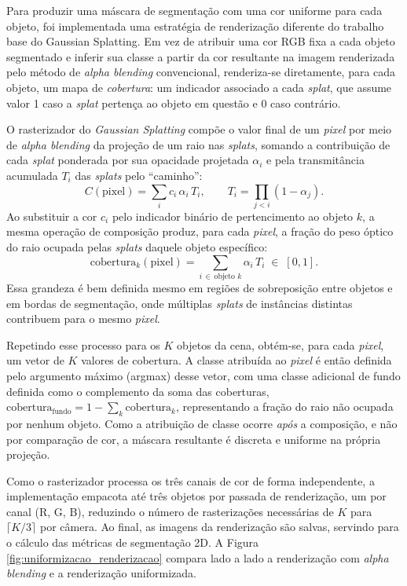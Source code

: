 Para produzir uma máscara de segmentação com uma cor uniforme para cada objeto, foi
implementada uma estratégia de renderização diferente do trabalho base do Gaussian Splatting. Em vez de atribuir uma cor RGB fixa a cada objeto segmentado e inferir sua classe a partir da cor resultante na imagem renderizada pelo método de \textit{alpha blending} convencional, renderiza-se diretamente, para cada objeto, um mapa de \textit{cobertura}: um indicador associado a cada
\emph{splat}, que assume valor 1 caso a
\emph{splat} pertença ao objeto em questão e 0 caso contrário.

O rasterizador do \textit{Gaussian Splatting} compõe o valor final de um
\textit{pixel} por meio de \textit{alpha blending} da projeção de um raio nas \emph{splats},
somando a contribuição de cada \emph{splat} ponderada por sua opacidade
projetada $\alpha_i$ e pela transmitância acumulada $T_i$ das \emph{splats} pelo ``caminho'':
\begin{equation}
    C(\text{pixel}) = \sum_{i} c_i \, \alpha_i \, T_i, \qquad
    T_i = \prod_{j<i} (1 - \alpha_j).
\end{equation}
Ao substituir a cor $c_i$ pelo indicador binário de pertencimento ao objeto
$k$, a mesma operação de composição produz, para cada \textit{pixel}, a
fração do peso óptico do raio ocupada pelas \emph{splats} daquele objeto
específico:
\begin{equation}
    \text{cobertura}_k(\text{pixel}) = \sum_{i \,\in\, \text{objeto } k} \alpha_i \, T_i \;\in\; [0,1].
\end{equation}
Essa grandeza é bem definida mesmo em regiões de sobreposição entre objetos e
em bordas de segmentação, onde múltiplas \emph{splats} de instâncias distintas
contribuem para o mesmo \textit{pixel}.

Repetindo esse processo para os $K$ objetos da cena, obtém-se, para cada
\textit{pixel}, um vetor de $K$ valores de cobertura. A classe atribuída ao
\textit{pixel} é então definida pelo argumento máximo (argmax) desse vetor, com uma
classe adicional de fundo definida como o complemento da soma das coberturas,
$\text{cobertura}_{\text{fundo}} = 1 - \sum_k \text{cobertura}_k$,
representando a fração do raio não ocupada por nenhum objeto. Como a
atribuição de classe ocorre \textit{após} a composição, e não por comparação
de cor, a máscara resultante é discreta e uniforme na própria projeção.

Como o rasterizador processa os três canais de cor de forma independente, a
implementação empacota até três objetos por passada de renderização, um por
canal (R, G, B), reduzindo o número de rasterizações necessárias de $K$
para $\lceil K/3 \rceil$ por câmera. Ao final, as imagens da renderização são salvas,
servindo para o cálculo das métricas de segmentação 2D. A Figura \ref{fig:uniformizacao_renderizacao} compara lado a lado a renderização com \textit{alpha blending} e a renderização uniformizada.

